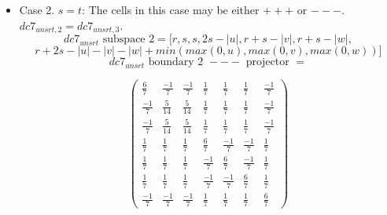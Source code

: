 \documentclass[preprint]{iucr}              %
\begin{document}
{\begin{itemize}
{\[dc7_{unsrt} \text{ boundary 1 } +++ \text{ minimal }w \text{ projector } =\]
\begin{center}
\begin{equation*}
\begin{pmatrix}
\frac{5}{14}&\frac{5}{14}&\frac{1}{7}&\frac{-1}{7}&\frac{-1}{7}&\frac{1}{7}&\frac{1}{7}\\[.25em]
\frac{5}{14}&\frac{5}{14}&\frac{1}{7}&\frac{-1}{7}&\frac{-1}{7}&\frac{1}{7}&\frac{1}{7}\\[.25em]
\frac{1}{7}&\frac{1}{7}&\frac{6}{7}&\frac{1}{7}&\frac{1}{7}&\frac{-1}{7}&\frac{-1}{7}\\[.25em]
\frac{-1}{7}&\frac{-1}{7}&\frac{1}{7}&\frac{6}{7}&\frac{-1}{7}&\frac{1}{7}&\frac{1}{7}\\[.25em]
\frac{-1}{7}&\frac{-1}{7}&\frac{1}{7}&\frac{-1}{7}&\frac{6}{7}&\frac{1}{7}&\frac{1}{7}\\[.25em]
\frac{1}{7}&\frac{1}{7}&\frac{-1}{7}&\frac{1}{7}&\frac{1}{7}&\frac{6}{7}&\frac{-1}{7}\\[.25em]
\frac{1}{7}&\frac{1}{7}&\frac{-1}{7}&\frac{1}{7}&\frac{1}{7}&\frac{-1}{7}&\frac{6}{7}
\end{pmatrix}
\end{equation*}
\end{center}

\[dc7_{unsrt} \text{ boundary 1 transforms}=\]
  \[ ---: [s,r,t,v+t+r,u+t+s,w+s+r,w+v+u+t+s+r] \]
  \[ +++: [s,r,t,-v+t+r,-u+t+s,-w+s+r,-w-v+2 min(u,v,w)-u+t+s+r]\]

}
     
     \item{Case 2. $s=t$:  The cells in this case may be either $+++$ or $---$.\\
     $dc7_{unsrt,2}=dc7_{unsrt,3}$.
     \[dc7_{unsrt}  \text{ subspace 2}=[r,s,s,2s-|u|,r+s-|v|,r+s-|w|,\]
     \[r+2s-|u|-|v|-|w|+min(max(0,u),max(0,v),max(0,w))]\]
     \[dc7_{unsrt} \text{ boundary 2 }---\text{ projector } =\]
\begin{center}
\begin{equation*}
\begin{pmatrix}
\frac{6}{7}&\frac{-1}{7}&\frac{-1}{7}&\frac{1}{7}&\frac{1}{7}&\frac{1}{7}&\frac{-1}{7}\\[.25em]
\frac{-1}{7}&\frac{5}{14}&\frac{5}{14}&\frac{1}{7}&\frac{1}{7}&\frac{1}{7}&\frac{-1}{7}\\[.25em]
\frac{-1}{7}&\frac{5}{14}&\frac{5}{14}&\frac{1}{7}&\frac{1}{7}&\frac{1}{7}&\frac{-1}{7}\\[.25em]
\frac{1}{7}&\frac{1}{7}&\frac{1}{7}&\frac{6}{7}&\frac{-1}{7}&\frac{-1}{7}&\frac{1}{7}\\[.25em]
\frac{1}{7}&\frac{1}{7}&\frac{1}{7}&\frac{-1}{7}&\frac{6}{7}&\frac{-1}{7}&\frac{1}{7}\\[.25em]
\frac{1}{7}&\frac{1}{7}&\frac{1}{7}&\frac{-1}{7}&\frac{-1}{7}&\frac{6}{7}&\frac{1}{7}\\[.25em]
\frac{-1}{7}&\frac{-1}{7}&\frac{-1}{7}&\frac{1}{7}&\frac{1}{7}&\frac{1}{7}&\frac{6}{7}
\end{pmatrix}
\end{equation*}
\end{center}


}
\end{itemize}}
\end{document}

